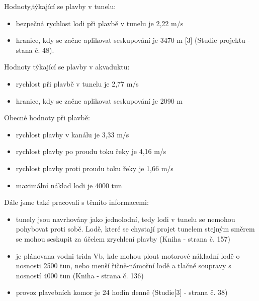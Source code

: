 \documentclass[11pt,a4paper]{article}
\begin{document}
    \noindent
    Hodnoty,týkající se plavby v tunelu:

    \begin{itemize}
      \item bezpečná rychlost lodi při plavbě v tunelu je 2,22 m/s

      \item hranice, kdy se začne aplikovat seskupování je 3470 m [3]
            (Studie projektu - stana č. 48).
    \end{itemize}

    \noindent
    Hodnoty týkající se plavby v akvaduktu:

    \begin{itemize}
      \item rychlost při plavbě v tunelu je 2,77 m/s
      \item hranice, kdy se začne aplikovat seskupování je 2090 m
    \end{itemize}

    \noindent
    Obecné hodnoty při plavbě:

    \begin{itemize}
      \item rychlost plavby v kanálu je 3,33 m/s
      \item rychlost plavby po proudu toku řeky je 4,16 m/s
      \item rychlost plavby proti proudu toku řeky je 1,66 m/s
      \item maximální náklad lodi je 4000 tun
    \end{itemize}

    \noindent
    Dále jsme také pracovali s těmito informacemi:

    \begin{itemize}
      \item tunely jsou navrhovány jako jednolodní, tedy lodi v tunelu se
            nemohou pohybovat proti sobě. Lodě, které se chystají projet
            tunelem stejným směrem se mohou seskupit za účelem zrychlení plavby
            (Kniha - strana č. 157)
      \item je plánovana vodni trida Vb, kde mohou plout motorové nákladní lodě
            o nosnosti 2500 tun, nebo menší řičně-námořní lodě a tlačné
            soupravy s nosností 4000 tun
            (Kniha - strana č. 136)
      \item provoz plavebních komor je 24 hodin denně
            (Studie[3] - strana č. 38)
    \end{itemize}
        
\end{document}
